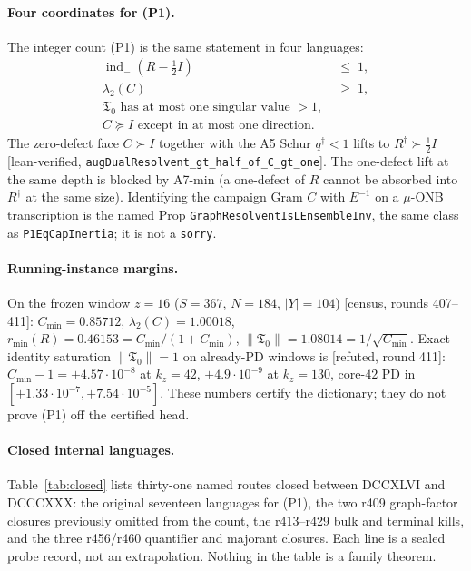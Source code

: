 \documentclass[11pt]{article}
\theoremstyle{remark}
\newcommand{\Rd}{R^{\dagger}}
\newcommand{\half}{\tfrac12}
\newcommand{\Tfrak}{\mathfrak{T}}
\newcommand{\gr}[1]{\textnormal{\small[#1]}}
\begin{document}
\paragraph{Four coordinates for (P1).}
The integer count (P1) is the same statement in four languages:
\begin{align}
\operatorname{ind}_{-}(R-\half I)&\;\le\;1,
\tag{inertia}\\
\lambda_{2}(C)&\;\ge\;1,
\tag{sampling}\\
\text{$\Tfrak_{0}$ has at most one singular value $>1$},
\tag{contraction}\\
C\succeq I
 \text{ except in at most one direction}.
\tag{energy split}
\end{align}
The zero-defect face $C\succ I$ together with the A5 Schur
$q^{\dagger}<1$ lifts to $\Rd\succ\half I$
\gr{lean-verified, \texttt{augDualResolvent\_gt\_half\_of\_C\_gt\_one}}.
The one-defect lift at the same depth is blocked by A7-min
(a one-defect of $R$ cannot be absorbed into $\Rd$ at the same
size).  Identifying the campaign Gram $C$ with $E^{-1}$ on a
$\mu$-ONB transcription is the named Prop
\texttt{GraphResolventIsLEnsembleInv}, the same class as
\texttt{P1EqCapInertia}; it is not a \texttt{sorry}.

\paragraph{Running-instance margins.}
On the frozen window $z=16$ ($S=367$, $N=184$, $|Y|=104$)
\gr{census, rounds 407--411}:
$C_{\min}=0.85712$,
$\lambda_{2}(C)=1.00018$,
$r_{\min}(R)=0.46153=C_{\min}/(1+C_{\min})$,
$\|\Tfrak_{0}\|=1.08014=1/\sqrt{C_{\min}}$.
Exact identity saturation $\|\Tfrak_{0}\|=1$ on already-PD
windows is \gr{refuted, round 411}:
$C_{\min}-1=+4.57\cdot10^{-8}$ at $k_{z}=42$,
$+4.9\cdot10^{-9}$ at $k_{z}=130$,
core-$42$ PD in $[+1.33\cdot10^{-7},+7.54\cdot10^{-5}]$.
These numbers certify the dictionary; they do not prove (P1)
off the certified head.

\paragraph{Closed internal languages.}
Table~\ref{tab:closed} lists thirty-one named routes closed
between DCCXLVI and DCCCXXX: the original seventeen languages
for (P1), the two r409 graph-factor closures previously omitted
from the count, the r413--r429 bulk and terminal kills, and the
three r456/r460 quantifier and majorant closures.
Each line is a sealed probe record, not an extrapolation.
Nothing in the table is a family theorem.
\end{document}
